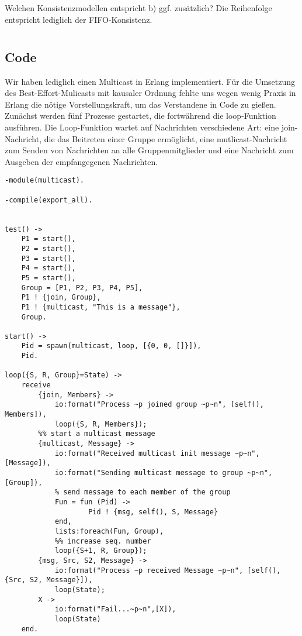 \documentclass[a4paper,9pt]{article}
\begin{document}
\subsection{}
Welchen Konsistenzmodellen entspricht b) ggf. zus\"atzlich? \newline
Die Reihenfolge entspricht lediglich der FIFO-Konsistenz.

\pagebreak{}
\section{}
\subsection{Code}

Wir haben lediglich einen Multicast in Erlang implementiert. Für die Umsetzung des Best-Effort-Mulicasts mit kausaler Ordnung fehlte uns wegen wenig Praxis in Erlang die nötige Vorstellungskraft, um das Verstandene in Code zu gießen.
Zunächst werden fünf Prozesse gestartet, die fortwährend die loop-Funktion ausführen. Die Loop-Funktion wartet auf Nachrichten verschiedene Art: eine join-Nachricht, die das Beitreten einer Gruppe ermöglicht, eine mutlicast-Nachricht zum Senden von Nachrichten an alle Gruppenmitglieder und eine Nachricht zum Ausgeben der empfangegenen Nachrichten.

\begin{verbatim}
-module(multicast).

-compile(export_all).


test() ->
    P1 = start(),
    P2 = start(),
    P3 = start(),
    P4 = start(),
    P5 = start(),
    Group = [P1, P2, P3, P4, P5],
    P1 ! {join, Group},
    P1 ! {multicast, "This is a message"},
    Group.

start() ->
    Pid = spawn(multicast, loop, [{0, 0, []}]),
    Pid.    

loop({S, R, Group}=State) ->
    receive
        {join, Members} ->
            io:format("Process ~p joined group ~p~n", [self(), Members]),
            loop({S, R, Members});
        %% start a multicast message
        {multicast, Message} ->
            io:format("Received multicast init message ~p~n", [Message]),
            io:format("Sending multicast message to group ~p~n", [Group]),
            % send message to each member of the group
            Fun = fun (Pid) ->
                    Pid ! {msg, self(), S, Message}
            end,
            lists:foreach(Fun, Group),
            %% increase seq. number
            loop({S+1, R, Group});
        {msg, Src, S2, Message} ->
            io:format("Process ~p received Message ~p~n", [self(), {Src, S2, Message}]),
            loop(State);
        X ->
            io:format("Fail...~p~n",[X]),
            loop(State)
    end.
\end{verbatim}
\pagebreak{}
\end{document}
